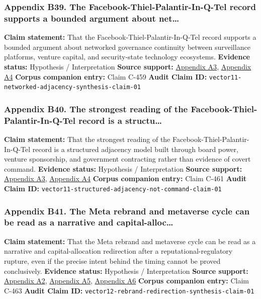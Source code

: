 \documentclass[
  american,
  11pt,
  letterpaper,
]{article}
\begin{document}
\subsubsection{Appendix B39. The Facebook-Thiel-Palantir-In-Q-Tel record
supports a bounded argument about
net\ldots{}}\label{appendix-b39-the-facebook-thiel-palantir-in-q-tel-record-supports-a-bounded-argument-about-net}

\textbf{Claim statement:} That the Facebook-Thiel-Palantir-In-Q-Tel
record supports a bounded argument about networked governance continuity
between surveillance platforms, venture capital, and security-state
technology ecosystems. \textbf{Evidence status:} Hypothesis /
Interpretation \textbf{Source support:}
\hyperref[appendix-a3-facebook-inc-registration-statement-on-form-s-1]{Appendix
A3},
\hyperref[appendix-a4-meta-platforms-inc-2022-definitive-proxy-statement]{Appendix
A4} \textbf{Corpus companion entry:} Claim C-459 \textbf{Audit Claim
ID:} \texttt{vector11-networked-adjacency-synthesis-claim-01}

\subsubsection{Appendix B40. The strongest reading of the
Facebook-Thiel-Palantir-In-Q-Tel record is a
structu\ldots{}}\label{appendix-b40-the-strongest-reading-of-the-facebook-thiel-palantir-in-q-tel-record-is-a-structu}

\textbf{Claim statement:} That the strongest reading of the
Facebook-Thiel-Palantir-In-Q-Tel record is a structured adjacency model
built through board power, venture sponsorship, and government
contracting rather than evidence of covert command. \textbf{Evidence
status:} Hypothesis / Interpretation \textbf{Source support:}
\hyperref[appendix-a3-facebook-inc-registration-statement-on-form-s-1]{Appendix
A3},
\hyperref[appendix-a4-meta-platforms-inc-2022-definitive-proxy-statement]{Appendix
A4} \textbf{Corpus companion entry:} Claim C-461 \textbf{Audit Claim
ID:} \texttt{vector11-structured-adjacency-not-command-claim-01}

\subsubsection{Appendix B41. The Meta rebrand and metaverse cycle can be
read as a narrative and
capital-alloc\ldots{}}\label{appendix-b41-the-meta-rebrand-and-metaverse-cycle-can-be-read-as-a-narrative-and-capital-alloc}

\textbf{Claim statement:} That the Meta rebrand and metaverse cycle can
be read as a narrative and capital-allocation redirection after a
reputational-regulatory rupture, even if the precise intent behind the
timing cannot be proved conclusively. \textbf{Evidence status:}
Hypothesis / Interpretation \textbf{Source support:}
\hyperref[appendix-a2-ftc-imposes-5-billion-penalty-and-sweeping-new-privacy-restrictions-on-facebook]{Appendix
A2}, \hyperref[appendix-a5-the-facebook-company-is-now-meta]{Appendix
A5},
\hyperref[appendix-a6-meta-platforms-inc-2023-annual-report-form-10-k]{Appendix
A6} \textbf{Corpus companion entry:} Claim C-463 \textbf{Audit Claim
ID:} \texttt{vector12-rebrand-redirection-synthesis-claim-01}
\end{document}
